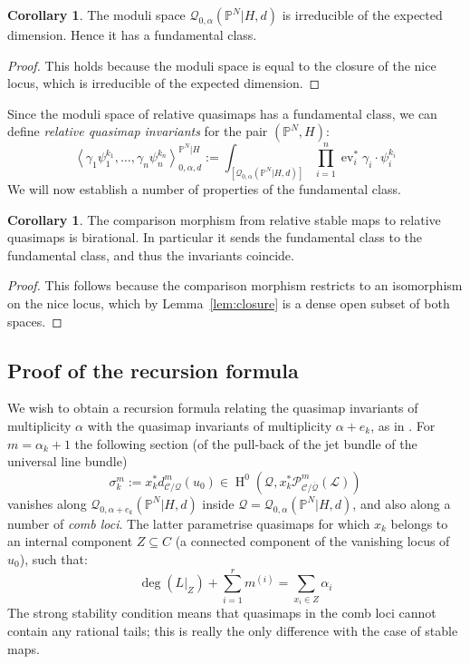 \documentclass[11pt]{amsart}
\newcommand{\Q}[4]{\mathcal{Q}_{#1,#2}(#3,#4)}
\newcommand{\PP}{\mathbb P}
\newcommand{\HH}{\operatorname{H}}
\newcommand{\ev}{\operatorname{ev}}
\newcommand{\om}[1]{\mathcal{#1}}
\theoremstyle{definition}
\newtheorem{cor}[thm]{Corollary}
\theoremstyle{definition}
\newcommand{\ilemph}[1]{\emph{#1}}
\begin{document}
\begin{cor} The moduli space $\Q{0}{\alpha}{\PP^N|H}{d}$ is irreducible of the expected dimension. Hence it has a fundamental class. \end{cor}
\begin{proof} This holds because the moduli space is equal to the closure of the nice locus, which is irreducible of the expected dimension. \end{proof}

Since the moduli space of relative quasimaps has a fundamental class, we can define \emph{relative quasimap invariants} for the pair $(\PP^N,H)$:
\begin{equation*} \left\langle \gamma_1 \psi_1^{k_1} , \ldots, \gamma_n \psi_n^{k_n} \right\rangle_{0,\alpha,d}^{\PP^N|H} := \int_{[\Q{0}{\alpha}{\PP^N|H}{d}]} \prod_{i=1}^n \ev_i^* \gamma_i \cdot \psi_i^{k_i} \end{equation*}
We will now establish a number of properties of the fundamental class.
\begin{cor} \label{Comparison morphism birational} The comparison morphism from relative stable maps to relative quasimaps is birational. In particular it sends the fundamental class to the fundamental class, and thus the invariants coincide. \end{cor}
\begin{proof} This follows because the comparison morphism restricts to an isomorphism on the nice locus, which by Lemma~\ref{lem:closure} is a dense open subset of both spaces. \end{proof}


\subsection{Proof of the recursion formula} \label{Subsection recursion formula for PN}
We wish to obtain a recursion formula relating the quasimap invariants of multiplicity $\alpha$ with the quasimap invariants of multiplicity $\alpha + e_k$, as in \cite[Theorem 2.6]{Ga}. For $m = \alpha_k + 1$ the following section (of the pull-back of the jet bundle of the universal line bundle)
\[
\sigma^m_k := x_k^*d^m_{\mathcal C/\om{Q}}(u_0)\in \HH^0(\om{Q},x_k^*\mathcal P^m_{\mathcal C/\overline{\mathcal Q}}(\mathcal L))
\]
vanishes along $\Q{0}{\alpha+e_k}{\PP^N|H}{d}$ inside $\om{Q} = \Q{0}{\alpha}{\PP^N|H}{d}$, and also along a number of \ilemph{comb loci}.  The latter parametrise quasimaps for which $x_k$ belongs to an internal component $Z \subseteq C$ (a connected component of the vanishing locus of $u_0$), such that:
\begin{equation*}\deg(L|_{Z})+\sum_{i=1}^r m^{(i)}=\sum_{x_i\in Z}\alpha_i \end{equation*}
The strong stability condition means that quasimaps in the comb loci cannot contain any rational tails; this is really the only difference with the case of stable maps.
\end{document}
